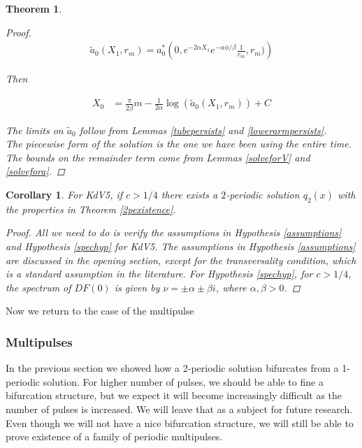 \documentclass[12pt]{article}
\newtheorem{theorem}{Theorem}
\newtheorem{corollary}{Corollary}
\begin{document}
\begin{theorem}
\begin{proof}
\begin{align*}
\tilde{a}_0(X_1, r_m) = a_0^*\left(0, e^{-2\alpha X_1}e^{-\alpha \phi / \beta}\frac{1}{r_m}, r_m)\right)
\end{align*}

Then 

\begin{align*}
X_0 &= \frac{\pi}{2 \beta} m - \frac{1}{2 \alpha} \log( \tilde{a}_0(X_1, r_m)) + C
\end{align*}

The limits on $\tilde{a}_0$ follow from Lemmas \ref{tubepersists} and \ref{lowerarmpersists}. \\

The piecewise form of the solution is the one we have been using the entire time. The bounds on the remainder term come from Lemmas \ref{solveforV} and \ref{solvefora}.

\end{proof}
\end{theorem}


\begin{corollary}
For KdV5, if $c > 1/4$ there exists a $2$-periodic solution $q_2(x)$ with the properties in Theorem \ref{2pexistence}.

\begin{proof}
All we need to do is verify the assumptions in Hypothesis \ref{assumptions} and Hypothesis \ref{spechyp} for KdV5. The assumptions in Hypothesis \ref{assumptions} are discussed in the opening section, except for the transversality condition, which is a standard assumption in the literature. For Hypothesis \ref{spechyp}, for $c > 1/4$, the spectrum of $DF(0)$ is given by $\nu = \pm \alpha \pm \beta i$, where $\alpha, \beta > 0$.
\end{proof}
\end{corollary}

Now we return to the case of the multipulse

\subsubsection{Multipulses}

In the previous section we showed how a 2-periodic solution bifurcates from a 1-periodic solution. For higher number of pulses, we should be able to fine a bifurcation structure, but we expect it will become increasingly difficult as the number of pulses is increased. We will leave that as a subject for future research. Even though we will not have a nice bifurcation structure, we will still be able to prove existence of a family of periodic multipulses. \\
\end{document}
